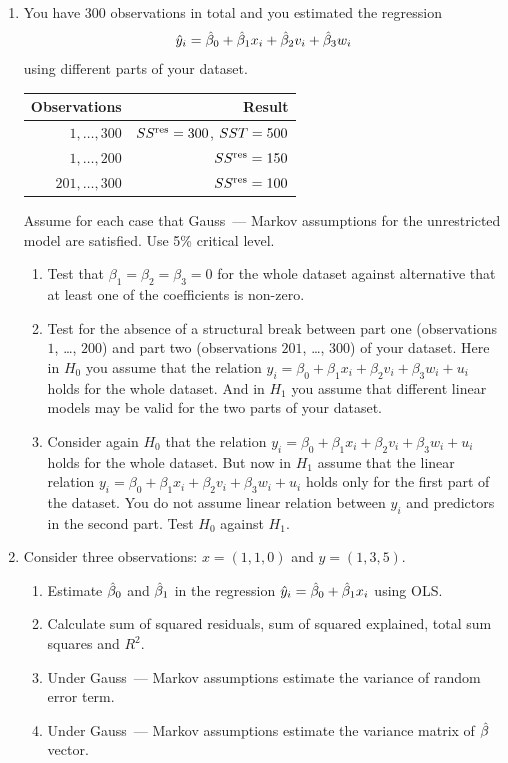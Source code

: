 \begin{enumerate}
    \item You have $300$ observations in total and you estimated the regression 
    \[
    \hat y_i = \hat{\beta}_0 + \hat{\beta}_1 x_i + \hat{\beta}_2 v_i + \hat{\beta}_3 w_i
    \]
    using different parts of your dataset.

    \begin{tabular}{rr}
        \toprule
        Observations & Result \\
        \midrule
        $1, \dots, 300$ & $SS^{\text{res}} = 300$, $SST = 500$ \\
        $1, \dots, 200$ & $SS^{\text{res}} = 150$ \\
        $201, \dots, 300$ & $SS^{\text{res}} = 100$ \\
        \bottomrule
    \end{tabular}


    Assume for each case that Gauss~— Markov assumptions for the unrestricted model are satisfied. 
    Use 5\% critical level. 

    \begin{enumerate}
        \item Test that $\beta_1 = \beta_2 = \beta_3 = 0$ for the whole dataset against alternative that at least one of the coefficients is non-zero.
        \item Test for the absence of a structural break between part one (observations $1$, \dots, $200$) and part two (observations $201$, \dots, $300$) of your dataset.
        Here in $H_0$ you assume that the relation $y_i = \beta_0 + \beta_1 x_i + \beta_2 v_i + \beta_3 w_i + u_i$
        holds for the whole dataset. 
        And in $H_1$ you assume that different linear models may be valid for the two parts of your dataset.
        \item Consider again $H_0$ that the relation $y_i = \beta_0 + \beta_1 x_i + \beta_2 v_i + \beta_3 w_i + u_i$
        holds for the whole dataset.
        But now in $H_1$ assume that the linear relation $y_i = \beta_0 + \beta_1 x_i + \beta_2 v_i + \beta_3 w_i + u_i$
        holds only for the first part of the dataset. 
        You do not assume linear relation between $y_i$ and predictors in the second part.
        Test $H_0$ against $H_1$.
    \end{enumerate}

    \item Consider three observations: $x = (1, 1, 0)$ and $y = (1, 3, 5)$.
    \begin{enumerate}
        \item Estimate $\hat{\beta}_0$ and $\hat{\beta}_1$ in the regression $\hat y_i = \hat{\beta}_0 + \hat{\beta}_1 x_i$ using OLS.
        \item Calculate sum of squared residuals, sum of squared explained, total sum squares and $R^2$.
        \item Under Gauss~— Markov assumptions estimate the variance of random error term.
        \item Under Gauss~— Markov assumptions estimate the variance matrix of $\hat{\beta}$ vector. 
    \end{enumerate}


\end{enumerate}
